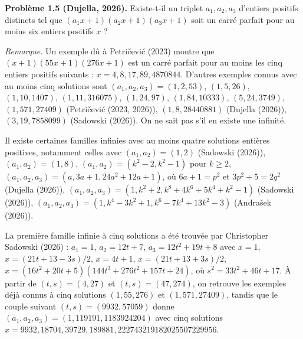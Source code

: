 \textbf{Problème 1.5 (Dujella, 2026).} Existe-t-il un triplet $a_1, a_2, a_3$ d'entiers positifs distincts tel que $(a_1x+1)(a_2x+1)(a_3x+1)$ soit un carré parfait pour au moins six entiers positifs $x$ ?

\medskip

\textit{Remarque.} Un exemple dû à Petričević (2023) montre que $(x+1)(55x+1)(276x+1)$ est un carré parfait pour au moins les cinq entiers positifs suivants : $x = 4, 8, 17, 89, 4870844$. D'autres exemples connus avec au moins cinq solutions sont $(a_1,a_2,a_3) = (1,2,53)$, $(1,5,26)$, $(1,10,1407)$, $(1,11,316075)$, $(1,24,97)$, $(1,84,10333)$, $(5,24,3749)$, $(1,571,27409)$ (Petričević (2023, 2026)), $(1,8,28440881)$ (Dujella (2026)), $(3,19,7858099)$ (Sadowski (2026)). On ne sait pas s'il en existe une infinité.

Il existe certaines familles infinies avec au moins quatre solutions entières positives, notamment celles avec $(a_1,a_2) = (1,2)$ (Sadowski (2026)), $(a_1,a_2) = (1,8)$, $(a_1,a_2) = (k^2-2, k^2-1)$ pour $k \geqslant 2$, $(a_1,a_2,a_3) = (a, 3a+1, 24a^2+12a+1)$, où $6a+1 = p^2$ et $3p^2+5 = 2q^2$ (Dujella (2026)), $(a_1,a_2,a_3) = (1, k^2+2, k^8+4k^6+5k^4+k^2-1)$ (Sadowski (2026)), $(a_1,a_2,a_3) = (1, k^4-3k^2+1, k^6-7k^4+13k^2-3)$ (Andrašek (2026)).

La première famille infinie à cinq solutions a été trouvée par Christopher Sadowski (2026) : $a_1=1$, $a_2=12t+7$, $a_3=12t^2+19t+8$ avec $x=1$, $x=(21t+13-3s)/2$, $x=4t+1$, $x=(21t+13+3s)/2$, $x=(16t^2+20t+5)(144t^3+276t^2+157t+24)$, où $s^2 = 33t^2+46t+17$. À partir de $(t,s)=(4,27)$ et $(t,s)=(47,274)$, on retrouve les exemples déjà connus à cinq solutions $(1,55,276)$ et $(1,571,27409)$, tandis que le couple suivant $(t,s)=(9932,57059)$ donne $(a_1,a_2,a_3)=(1,119191,1183924204)$ avec cinq solutions $x = 9932, 18704, 39729, 189881, 222743219182025507229956$.
